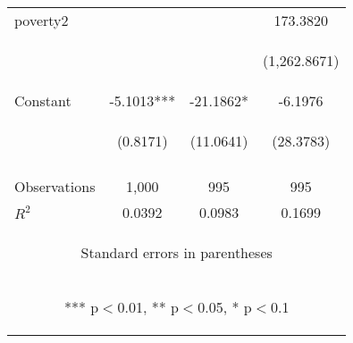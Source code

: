 \begin{center}
\begin{tabular}{lccc}
poverty2 &  &  & 173.3820 \\
\vspace{4pt} & \begin{footnotesize}\end{footnotesize} & \begin{footnotesize}\end{footnotesize} & \begin{footnotesize}(1,262.8671)\end{footnotesize} \\
Constant & -5.1013*** & -21.1862* & -6.1976 \\
 & \begin{footnotesize}(0.8171)\end{footnotesize} & \begin{footnotesize}(11.0641)\end{footnotesize} & \begin{footnotesize}(28.3783)\end{footnotesize} \\
\vspace{4pt} & \begin{footnotesize}\end{footnotesize} & \begin{footnotesize}\end{footnotesize} & \begin{footnotesize}\end{footnotesize} \\
Observations & 1,000 & 995 & 995 \\
 $R^2$ & 0.0392 & 0.0983 & 0.1699 \\ \hline
\multicolumn{4}{c}{\begin{footnotesize} Standard errors in parentheses\end{footnotesize}} \\
\multicolumn{4}{c}{\begin{footnotesize} *** p$<$0.01, ** p$<$0.05, * p$<$0.1\end{footnotesize}} \\
\end{tabular}
\end{center}
